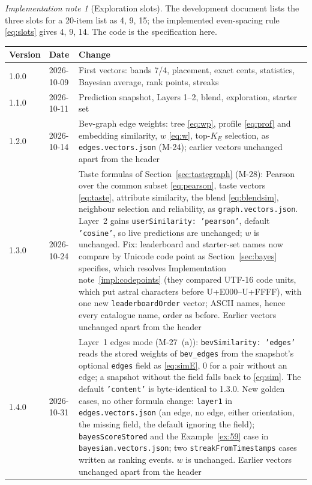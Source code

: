\documentclass[11pt]{article}
\newcommand{\code}[1]{\texttt{#1}}
\theoremstyle{plain}
\theoremstyle{definition}
\theoremstyle{remark}
\newtheorem{implnote}[theorem]{Implementation note}
\begin{document}
\begin{implnote}[Exploration slots]
The development document lists the three slots for a 20-item list as 4, 9, 15; the implemented even-spacing rule \eqref{eq:slots} gives 4, 9, 14. The code is the specification here.
\end{implnote}

\begin{center}
\begin{tabular}{@{}llp{9.5cm}@{}}
\toprule
Version & Date & Change \\
\midrule
1.0.0 & 2026-10-09 & First vectors: bands 7/4, placement, exact cents, statistics, Bayesian average, rank points, streaks \\
1.1.0 & 2026-10-11 & Prediction snapshot, Layers 1--2, blend, exploration, starter set \\
1.2.0 & 2026-10-14 & Bev-graph edge weights: tree \eqref{eq:wp}, profile \eqref{eq:prof} and embedding similarity, $w$ \eqref{eq:w}, top-$K_E$ selection, as \code{edges.vectors.json} (M-24); earlier vectors unchanged apart from the header \\
1.3.0 & 2026-10-24 & Taste formulas of Section~\ref{sec:tastegraph} (M-28): Pearson over the common subset \eqref{eq:pearson}, taste vectors \eqref{eq:taste}, attribute similarity, the blend \eqref{eq:blendsim}, neighbour selection and reliability, as \code{graph.vectors.json}. Layer~2 gains \code{userSimilarity: 'pearson'}, default \code{'cosine'}, so live predictions are unchanged; $w$ is unchanged. Fix: leaderboard and starter-set names now compare by Unicode code point as Section~\ref{sec:bayes} specifies, which resolves Implementation note~\ref{impl:codepoints} (they compared UTF-16 code units, which put astral characters before U+E000--U+FFFF), with one new \code{leaderboardOrder} vector; ASCII names, hence every catalogue name, order as before. Earlier vectors unchanged apart from the header \\
1.4.0 & 2026-10-31 & Layer~1 edges mode (M-27~(a)): \code{bevSimilarity: 'edges'} reads the stored weights of \code{bev\_edges} from the snapshot's optional \code{edges} field as \eqref{eq:simE}, $0$ for a pair without an edge; a snapshot without the field falls back to \eqref{eq:sim}. The default \code{'content'} is byte-identical to 1.3.0. New golden cases, no other formula change: \code{layer1} in \code{edges.vectors.json} (an edge, no edge, either orientation, the missing field, the default ignoring the field); \code{bayesScoreStored} and the Example~\ref{ex:59} case in \code{bayesian.vectors.json}; two \code{streakFromTimestamps} cases written as ranking events. $w$ is unchanged. Earlier vectors unchanged apart from the header \\

\end{tabular}
\end{center}
\end{document}
